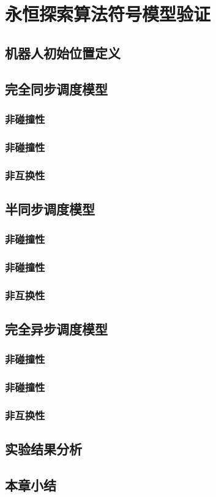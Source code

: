 \chapter{永恒探索算法符号模型验证}

\section{机器人初始位置定义}

\section{完全同步调度模型}
\subsection{非碰撞性}

\subsection{非碰撞性}

\subsection{非互换性}

\section{半同步调度模型}
\subsection{非碰撞性}

\subsection{非碰撞性}

\subsection{非互换性}

\section{完全异步调度模型}
\subsection{非碰撞性}

\subsection{非碰撞性}

\subsection{非互换性}

\section{实验结果分析}


\section{本章小结}
